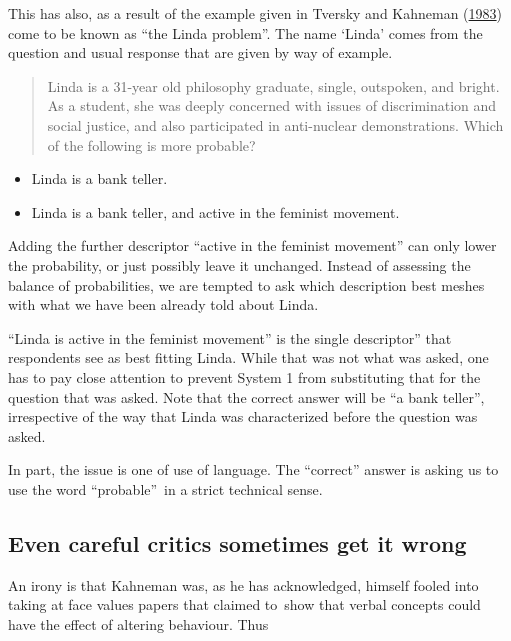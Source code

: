 \documentclass[
  10ptls,
  b5paper]{book}
\providecommand{\tightlist}{%
  \setlength{\itemsep}{0pt}\setlength{\parskip}{0pt}}
\begin{document}
This has also, as a result of the example given in
Tversky and Kahneman (\protect\hyperlink{ref-tversky1983extensional}{1983}) come to be known as ``the Linda problem''.
The name `Linda' comes from the question and usual response
that are given by way of example.

\begin{quote}
Linda is a 31-year old philosophy graduate, single, outspoken, and bright. As a student, she was deeply concerned with issues of discrimination and social justice, and also participated in anti-nuclear demonstrations. Which of the following is more probable?
\end{quote}

\begin{itemize}
\tightlist
\item
  Linda is a bank teller.
\item
  Linda is a bank teller, and active in the feminist movement.
\end{itemize}

Adding the further descriptor ``active in the feminist movement'' can only lower the probability, or just possibly leave it unchanged. Instead of assessing the balance of probabilities, we are tempted to ask which description best meshes with what we have been already told about Linda.

``Linda is active in the feminist movement'' is the single descriptor'' that respondents see as best fitting Linda. While that was not what was asked, one has to pay close attention to prevent System 1 from substituting that for the question that was asked. Note that the correct answer will be ``a bank teller'', irrespective of the way that Linda was characterized before the question was asked.

In part, the issue is one of use of language. The ``correct'' answer is asking us to use the word ``probable''~in a strict technical sense.

\hypertarget{even-careful-critics-sometimes-get-it-wrong}{%
\subsection*{Even careful critics sometimes get it wrong}\label{even-careful-critics-sometimes-get-it-wrong}}

An irony is that Kahneman was, as he has acknowledged, himself fooled into taking at face values papers that claimed to~show that verbal concepts could have the effect of altering behaviour. Thus
\end{document}
